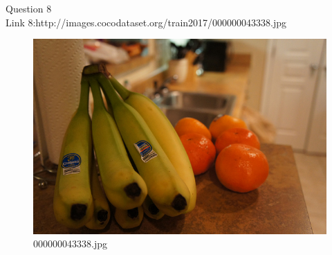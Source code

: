 Question 8\\
Link 8:http://images.cocodataset.org/train2017/000000043338.jpg
    \begin{figure}[h]
        \centering
        \includegraphics[width=0.8\linewidth]{../image set/easy/000000043338.jpg}
        \caption{000000043338.jpg}
    \end{figure}
